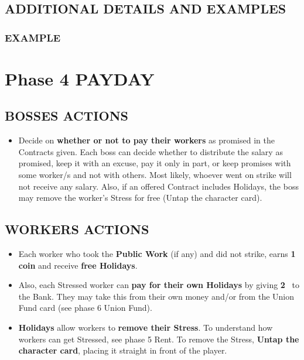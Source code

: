     \subsection{ADDITIONAL DETAILS AND EXAMPLES}

        \subsubsection{EXAMPLE}



\section{Phase 4 PAYDAY}
    
    \subsection{BOSSES ACTIONS}

        \begin{itemize}
            \item Decide on \textbf{whether or not to pay their workers} as promised in the Contracts
            given. Each boss can decide whether to distribute the salary as promised,
            keep it with an excuse, pay it only in part, or keep promises with some
            worker/s and not with others. Most likely, whoever went on strike will not
            receive any salary. Also, if an offered Contract includes Holidays, the boss
            may remove the worker's Stress for free (Untap the character card).
        \end{itemize}
    
    \subsection{WORKERS ACTIONS}

        \begin{itemize}
            \item Each worker who took the \textbf{Public Work} (if any) and did not strike, earns \textbf{1
            coin} and receive \textbf{free Holidays}.
            \item Also, each Stressed worker can \textbf{pay for their own Holidays} by giving \textbf{2 \faRubleSign}\ to
            the Bank. They may take this from their own money and/or from the Union
            Fund card (see phase 6 Union Fund).
            \item \textbf{Holidays} allow workers to \textbf{remove their Stress}. To understand how workers
            can get Stressed, see phase 5 Rent. To remove the Stress, \textbf{Untap the character
            card}, placing it straight in front of the player.
        \end{itemize}
    
